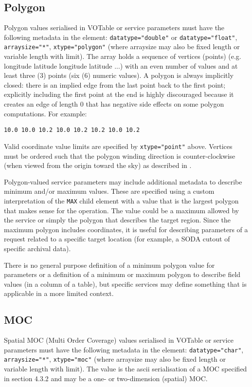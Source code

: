 \documentclass[11pt,letter]{ivoa}
\begin{document}
\subsection{Polygon}
Polygon values serialised in VOTable or service parameters must have the following metadata in the
 element: \verb|datatype="double"| or \verb|datatype="float"|,  \verb|arraysize="*"|, \verb|xtype="polygon"|
(where arraysize may also be fixed length or variable length with limit).
The array holds a sequence of vertices (points) (e.g. longitude latitude longitude
latitude ...) with an even number of values and at least three (3) points (six
(6) numeric values). A polygon is always implicitly closed: there is an implied edge from
the last point back to the first point; explicitly including the first point at the end is
highly discouraged because it creates an edge of length 0 that has
negative side effects on some polygon computations. For example:

\begin{verbatim}
10.0 10.0 10.2 10.0 10.2 10.2 10.0 10.2
\end{verbatim}

Valid coordinate value limits are specified by \verb|xtype="point"| above. 
Vertices must be ordered such that the polygon
winding direction is counter-clockwise (when viewed from the origin toward the
sky) as described in \citep{2007ivoa.spec.1030R}.

Polygon-valued service parameters may include additional metadata to describe minimum
and/or maximum values. These are specified using a custom interpretation of the
\verb|MAX| child element with a value that is the largest polygon that makes sense
for the operation. The value could be a maximum allowed by the service or simply
the polygon that describes the target region. Since the maximum polygon includes
coordinates, it is useful for describing parameters of a request related
to a specific target location (for example, a SODA cutout of specific archival data).

There is no general purpose definition of a minimum polygon value for parameters or
a definition of a minimum or maximum polygon to describe field values (in a column
of a table), but specific services may define something that is applicable in a
more limited context.

\subsection{MOC}
Spatial MOC (Multi Order Coverage) values serialised in VOTable or service parameters must
have the following metadata in the  element:
\verb|datatype="char"|, \verb|arraysize="*"|, \verb|xtype="moc"|
(where arraysize may also be fixed length or variable length with limit).
The value is the ascii serialisation of a MOC specified in \citet{2022ivoa.spec.0727F}
section 4.3.2 and may be a one- or two-dimension (spatial) MOC.
\end{document}
